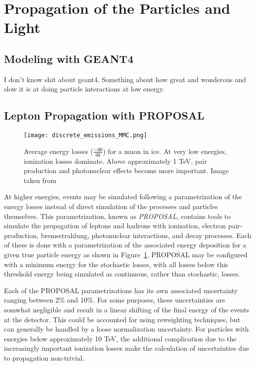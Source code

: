 \section{Propagation of the Particles and Light}
\label{sec:propagation}
\subsection{Modeling with GEANT4}
\label{subsec:geant}
I don't know shit about geant4.
Something about how great and wonderous and slow it is at doing particle interactions at low energy.

\subsection{Lepton Propagation with PROPOSAL}
\label{subsec:proposal}

\begin{figure}
\centering
\texttt{[image: discrete\_emissions\_MMC.png]}
\caption{Average energy losses ($\mathtt{\frac{-dE}{dX}}$) for a muon in ice. At very low energies, ionization losses dominate. Above approximately 1 TeV, pair production and photonuclear effects become more important. Image taken from \cite{Dima-MMC}}
\label{fig:discrete_emissions}
\end{figure}

At higher energies, events may be simulated following a parametrization of the energy losses instead of direct simulation of the processes and particles themselves.
This parametrization, known as \emph{PROPOSAL}, contains tools to simulate the propagation of leptons and hadrons with ionization, electron pair-production, bremsstrahlung, photonuclear interactions, and decay processes.
Each of these is done with a parametrization of the associated energy deposition for a given true particle energy as shown in Figure~\ref{fig:discrete_emissions}.
PROPOSAL may be configured with a minimum energy for the stochastic losses, with all losses below this threshold energy being simulated as continuous, rather than stochastic, losses.

Each of the PROPOSAL parametrizations has its own associated uncertainty ranging between 2\% and 10\%.
For some purposes, these uncertainties are somwhat negligible and result in a linear shifting of the final energy of the events at the detector.
This could be accounted for using reweighting techniques, but can generally be handled by a loose normalization uncertainty.
For particles with energies below approximately 10 TeV, the additional complication due to the increasingly important ionization losses make the calculation of uncertainties due to propagation non-trivial.



